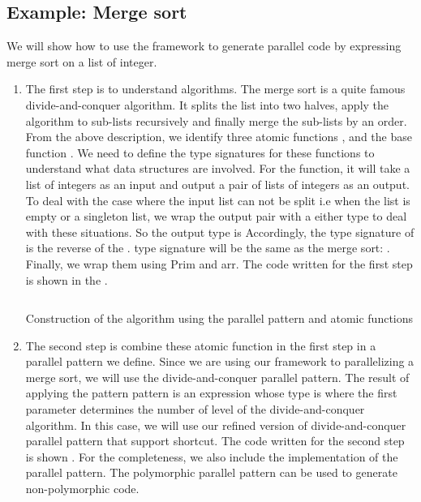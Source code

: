 \subsection{Example: Merge sort}

We will show how to use the framework to generate parallel code by expressing merge sort on a list of integer.
\begin{enumerate}
\begin{listing}[ht]
\begin{verbatim}
split :: SArrow [Int] (Either (Either () Int) ([Int], [Int]))
split = arr $ Prim "split" undefined
    
merge :: SArrow (Either (Either () Int) ([Int], [Int])) [Int]
merge = arr $ Prim "merge" undefined
    
sort :: SArrow [Int] [Int]
sort = arr $ Prim "sort" undefined
\end{verbatim}
\caption{The code for atomic functions}
\label{eval:code:step1}
\end{listing}
    \item The first step is to understand algorithms. The merge sort is a quite famous divide-and-conquer algorithm. It splits the list into two halves, apply the algorithm to sub-lists recursively and finally merge the sub-lists by an order. From the above description, we identify three atomic functions ,  and the base function .  We need to define the type signatures for these functions to understand what data structures are involved. For the  function, it will take a list of integers \hask{[Int]} as an input and output a pair of lists of integers  as an output. To deal with the case where the input list can not be split i.e when the list is empty or a singleton list, we wrap the output pair with a either type to deal with these situations. So the output type is  Accordingly, the type signature of  is the reverse of the .  type signature will be the same as the merge sort: \hask{[Int] -> [Int]}. Finally, we wrap them using Prim and arr. The code written for the first step is shown in the .
\begin{listing}[ht]
\inputminted{Haskell}{eval/step2.hs}
\caption{Construction of the algorithm using the parallel pattern and atomic functions}
\label{eval:code:step2}
\end{listing}
    \item The second step is combine these atomic function in the first step in a parallel pattern we define. Since we are using our framework to parallelizing a merge sort, we will use the divide-and-conquer parallel pattern. The result of applying the pattern pattern is an expression whose type is  where the first parameter determines the number of level of the divide-and-conquer algorithm. In this case, we will use our refined version of divide-and-conquer parallel pattern that support shortcut. The code written for the second step is shown . For the completeness, we also include the implementation of the parallel pattern. The polymorphic parallel pattern can be used to generate non-polymorphic code. 

\end{enumerate}
